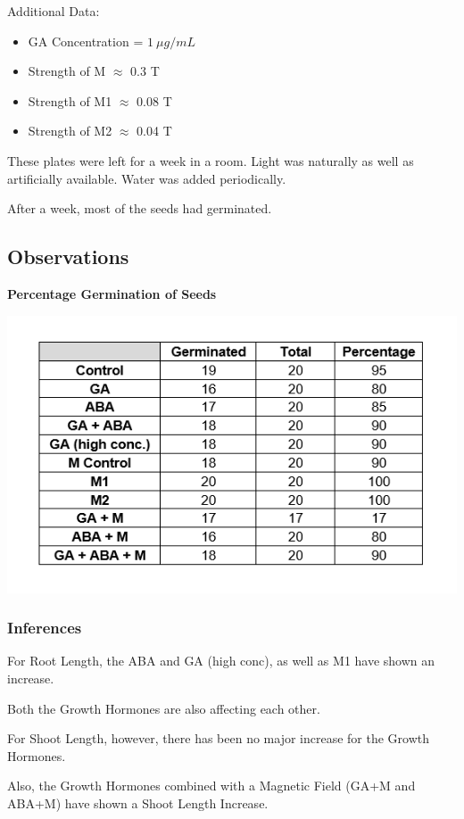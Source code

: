 \documentclass[twocolumn]{article}
\begin{document}
Additional Data:
\begin{itemize}
    \item GA Concentration = $1\ \mu g / mL$
    \item Strength of M $\approx$ 0.3 T
    \item Strength of M1 $\approx$ 0.08 T
    \item Strength of M2 $\approx$ 0.04 T
\end{itemize}

These plates were left for a week in a room. Light was naturally as well as artificially available. Water was added periodically. 

After a week, most of the seeds had germinated. 

\subsection{Observations}

\textbf{Percentage Germination of Seeds}

\includegraphics[width = \linewidth]{Number of Seeds Germinated.png}


\subsubsection{Inferences}

For Root Length, the ABA and GA (high conc), as well as M1 have shown an increase. 

Both the Growth Hormones are also affecting each other. 

For Shoot Length, however, there has been no major increase for the Growth Hormones.

Also, the Growth Hormones combined with a Magnetic Field (GA+M and ABA+M) have shown a Shoot Length Increase. 
\end{document}

